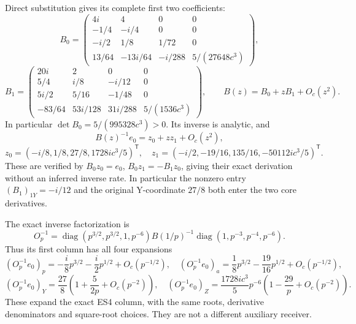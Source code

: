 Direct substitution gives its complete first two coefficients: \[
B_0=\begin{pmatrix}
4i&4&0&0\\-1/4&-i/4&0&0\\-i/2&1/8&1/72&0\\
13/64&-13i/64&-i/288&5/(27648c^3)
\end{pmatrix},
\] \[
B_1=\begin{pmatrix}
20i&2&0&0\\5/4&i/8&-i/12&0\\5i/2&5/16&-1/48&0\\
-83/64&53i/128&31i/288&5/(1536c^3)
\end{pmatrix},\qquad B(z)=B_0+zB_1+O_c(z^2).
\tag{ES19}
\] In particular \(\det B_0=5/(995328c^3)>0\). Its inverse is analytic, and \[
B(z)^{-1}e_0=z_0+zz_1+O_c(z^2),
\] \[
z_0=(-i/8,1/8,27/8,1728ic^3/5)^{\mathsf T},\quad
z_1=(-i/2,-19/16,135/16,-50112ic^3/5)^{\mathsf T}.
\tag{ES20}
\] These are verified by \(B_0z_0=e_0\), \(B_0z_1=-B_1z_0\), giving their exact derivation without an inferred inverse rate. In particular the nonzero entry \((B_1)_{1Y}=-i/12\) and the original Y-coordinate \(27/8\) both enter the two core derivatives.

The exact inverse factorization is \[
O_p^{-1}=\operatorname{diag}(p^{3/2},p^{3/2},1,p^{-6})B(1/p)^{-1}
\operatorname{diag}(1,p^{-3},p^{-4},p^{-6}).
\tag{ES21}
\] Thus its first column has all four expansions \[
(O_p^{-1}e_0)_p=-\frac i8p^{3/2}-\frac i2p^{1/2}+O_c(p^{-1/2}),
\quad (O_p^{-1}e_0)_a=\frac18p^{3/2}-\frac{19}{16}p^{1/2}+O_c(p^{-1/2}),
\] \[
(O_p^{-1}e_0)_Y=\frac{27}{8}\left(1+\frac{5}{2p}+O_c(p^{-2})\right),
\quad (O_p^{-1}e_0)_Z=\frac{1728ic^3}{5}p^{-6}
\left(1-\frac{29}{p}+O_c(p^{-2})\right).
\tag{ES22}
\] These expand the exact ES4 column, with the same roots, derivative denominators and square-root choices. They are not a different auxiliary receiver.


